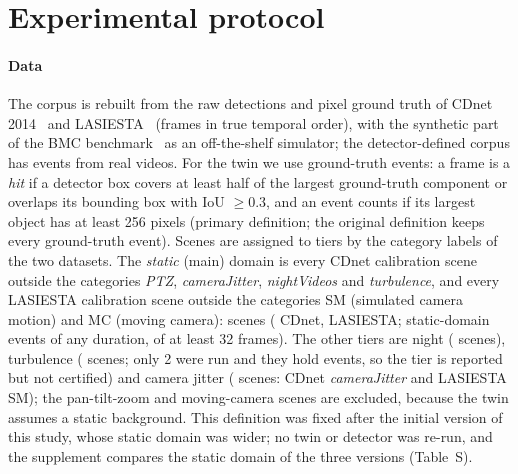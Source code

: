 \section{Experimental protocol}\label{sec:protocol}

\paragraph{Data} The corpus is rebuilt from the raw detections and pixel ground truth of CDnet 2014~\cite{cdnet2014} and
LASIESTA~\cite{lasiesta2016} (frames in true temporal order), with the synthetic part of the BMC benchmark~\cite{bmc2012} as an
off-the-shelf simulator; the detector-defined corpus has \nCorpusT{} events from \nCorpusTvideos{} real videos. For the
twin we use ground-truth events: a frame is a \emph{hit} if a detector box covers at least half of the largest
ground-truth component or overlaps its bounding box with IoU $\ge0.3$, and an event counts if its largest object has at
least 256 pixels (primary definition; the original definition keeps every ground-truth event). Scenes are assigned
to tiers by the category labels of the two datasets. The \emph{static} (main) domain is every CDnet calibration scene
outside the categories \emph{PTZ}, \emph{cameraJitter}, \emph{nightVideos} and \emph{turbulence}, and every LASIESTA
calibration scene outside the categories SM (simulated camera motion) and MC (moving camera): \nMainScenes{} scenes
(\nMainCDnet{} CDnet, \nMainLASIESTA{} LASIESTA; \nDefAllA{} static-domain events of any duration, \nMainN{} of at least 32 frames).
The other tiers are night (\nNightScenes{} scenes), turbulence (\nTurbScenes{} scenes; only 2 were run and they hold
\nTurbN{} events, so the tier is reported but not certified) and camera jitter (\nJitterScenes{} scenes: CDnet
\emph{cameraJitter} and LASIESTA SM); the \nPTZScenes{} pan-tilt-zoom and \nMCScenes{} moving-camera scenes are
excluded, because the twin assumes a static background. This definition was fixed after the initial version of this
study, whose static domain was wider; no twin or detector was re-run, and the supplement compares the static domain
of the three versions (Table~S\SuppTabVersions).

